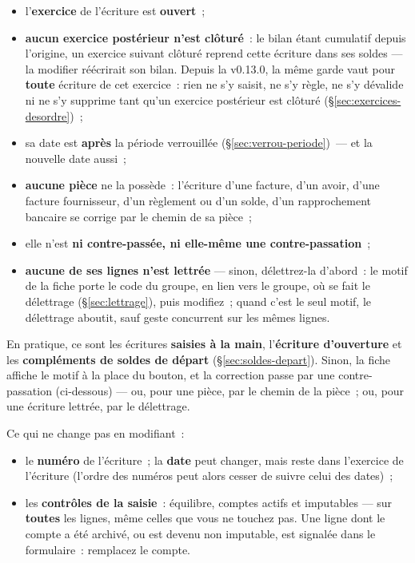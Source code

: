 \documentclass[a4paper,11pt,oneside]{article}
\begin{document}
\begin{itemize}
    \item l'\textbf{exercice} de l'écriture est \textbf{ouvert}~;
    \item \textbf{aucun exercice postérieur n'est clôturé}~: le bilan étant cumulatif depuis
          l'origine, un exercice suivant clôturé reprend cette écriture dans ses soldes ---
          la modifier réécrirait son bilan. Depuis la v0.13.0, la même garde vaut pour
          \textbf{toute} écriture de cet exercice~: rien ne s'y saisit, ne s'y règle, ne s'y
          dévalide ni ne s'y supprime tant qu'un exercice postérieur est clôturé
          (\S\ref{sec:exercices-desordre})~;
    \item sa date est \textbf{après} la période verrouillée (\S\ref{sec:verrou-periode})~---
          et la nouvelle date aussi~;
    \item \textbf{aucune pièce} ne la possède~: l'écriture d'une facture, d'un avoir, d'une
          facture fournisseur, d'un règlement ou d'un solde, d'un rapprochement bancaire se
          corrige par le chemin de sa pièce~;
    \item elle n'est \textbf{ni contre-passée, ni elle-même une contre-passation}~;
    \item \textbf{aucune de ses lignes n'est lettrée} --- sinon, délettrez-la d'abord~: le
          motif de la fiche porte le code du groupe, en lien vers le groupe, où se fait le
          délettrage (\S\ref{sec:lettrage}), puis modifiez~; quand c'est le seul motif, le
          délettrage aboutit, sauf geste concurrent sur les mêmes lignes.
\end{itemize}

En pratique, ce sont les écritures \textbf{saisies à la main}, l'\textbf{écriture
d'ouverture} et les \textbf{compléments de soldes de départ}
(\S\ref{sec:soldes-depart}). Sinon, la fiche affiche le motif à la place du bouton, et la
correction passe par une contre-passation (ci-dessous) --- ou, pour une pièce, par le chemin
de la pièce~; ou, pour une écriture lettrée, par le délettrage.

Ce qui ne change pas en modifiant~:

\begin{itemize}
    \item le \textbf{numéro} de l'écriture~; la \textbf{date} peut changer, mais reste dans
          l'exercice de l'écriture (l'ordre des numéros peut alors cesser de suivre celui
          des dates)~;
    \item les \textbf{contrôles de la saisie}~: équilibre, comptes actifs et imputables ---
          sur \textbf{toutes} les lignes, même celles que vous ne touchez pas. Une ligne
          dont le compte a été archivé, ou est devenu non imputable, est signalée dans le
          formulaire~: remplacez le compte.
\end{itemize}
\end{document}
